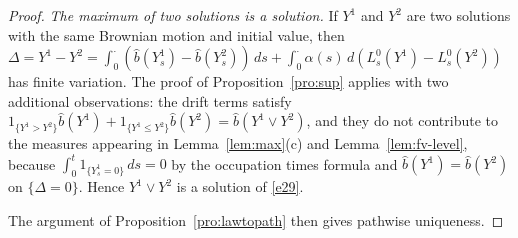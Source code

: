 \begin{proof}
	\emph{The maximum of two solutions is a solution.} If $Y^1$ and $Y^2$ are two
	solutions with the same Brownian motion and initial value, then
	$\Delta = Y^1 - Y^2 = \int_0^\cdot(\hat{b}(Y^1_s) - \hat{b}(Y^2_s))\,ds + \int_0^\cdot \alpha(s)\,d(L^0_s(Y^1) - L^0_s(Y^2))$
	has finite variation. The proof of Proposition~\ref{pro:sup} applies with two
	additional observations: the drift terms satisfy
	$1_{\{Y^1>Y^2\}}\hat{b}(Y^1) + 1_{\{Y^1\leqslant Y^2\}}\hat{b}(Y^2) = \hat{b}(Y^1\vee Y^2)$,
	and they do not contribute to the measures appearing in Lemma~\ref{lem:max}(c)
	and Lemma~\ref{lem:fv-level}, because $\int_0^t 1_{\{Y^1_s = 0\}}\,ds = 0$ by the
	occupation times formula and $\hat{b}(Y^1) = \hat{b}(Y^2)$ on $\{\Delta = 0\}$.
	Hence $Y^1\vee Y^2$ is a solution of \eqref{e29}.

	The argument of Proposition~\ref{pro:lawtopath} then gives pathwise uniqueness.
\end{proof}
